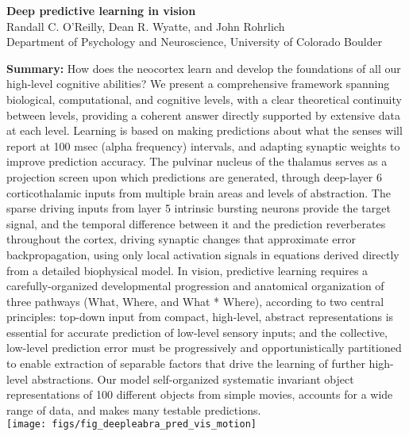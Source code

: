 \documentclass[12pt,twoside]{article}
\newif\myifpdf
\begin{document}


\sloppy
\raggedbottom

\begin{center}
{\large \bf Deep predictive learning in vision}\\
Randall C. O'Reilly, Dean R. Wyatte, and John Rohrlich\\
 Department of Psychology and Neuroscience, University of Colorado Boulder
\end{center}

{\bf Summary:}   How does the neocortex learn and develop the foundations of all our high-level cognitive abilities?  We present a comprehensive framework spanning biological, computational, and cognitive levels, with a clear theoretical continuity between levels, providing a coherent answer directly supported by extensive data at each level.  Learning is based on making predictions about what the senses will report at 100 msec (alpha frequency) intervals, and adapting synaptic weights to improve prediction accuracy.  The pulvinar nucleus of the thalamus serves as a projection screen upon which predictions are generated, through deep-layer 6 corticothalamic inputs from multiple brain areas and levels of abstraction.  The sparse driving inputs from layer 5 intrinsic bursting neurons provide the target signal, and the temporal difference between it and the prediction reverberates throughout the cortex, driving synaptic changes that approximate error backpropagation, using only local activation signals in equations derived directly from a detailed biophysical model.  In vision, predictive learning requires a carefully-organized developmental progression and anatomical organization of three pathways (What, Where, and What * Where), according to two central principles: top-down input from compact, high-level, abstract representations is essential for accurate prediction of low-level sensory inputs; and the collective, low-level prediction error must be progressively and opportunistically partitioned to enable extraction of separable factors that drive the learning of further high-level abstractions.  Our model self-organized systematic invariant object representations of 100 different objects from simple movies, accounts for a wide range of data, and makes many testable predictions.\\

{\centering\texttt{[image: figs/fig\_deepleabra\_pred\_vis\_motion]}\\}
\end{document}
